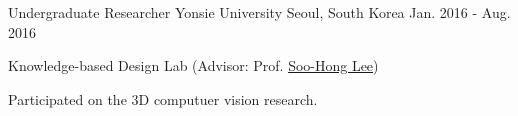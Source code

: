 \begin{cventries}
\cventry
{Undergraduate Researcher} %
{Yonsie University} %
{Seoul, South Korea} %
{Jan. 2016 - Aug. 2016} %
{ %
\begin{cvitems}
\item {Knowledge-based Design Lab (Advisor: Prof. \href{https://kbd.yonsei.ac.kr}{Soo-Hong Lee})}
\item {Participated on the 3D computuer vision research.}
\end{cvitems}
}



\end{cventries}
